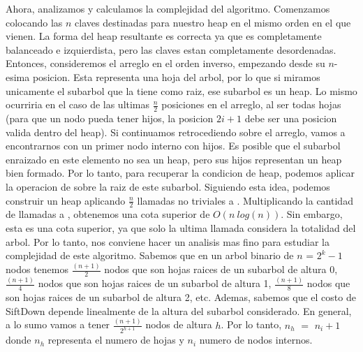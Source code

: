 \documentclass[10pt,a4paper]{article}
\begin{document}
Ahora, analizamos y calculamos la complejidad del algoritmo.
\newline
\newline
Comenzamos colocando las $n$ claves destinadas para nuestro heap en el mismo orden en el que
vienen. La forma del heap resultante es correcta ya que es completamente balanceado e izquierdista, pero las claves estan completamente desordenadas. 
\newline
\newline
Entonces, consideremos el arreglo en el orden inverso, empezando desde su $n$-esima posicion. Esta representa una hoja del arbol, por lo que si miramos unicamente el subarbol que la tiene como raiz, ese subarbol es un heap. Lo mismo ocurriria en el caso de las ultimas $\displaystyle \frac{n}{2}$ posiciones en el arreglo, al ser todas hojas (para que un nodo pueda tener hijos, la posicion $2i + 1$ debe ser una posicion valida dentro del heap). Si continuamos retrocediendo sobre el arreglo, vamos a encontrarnos con un primer nodo interno con hijos. Es posible que el subarbol enraizado en este elemento no sea un heap, pero sus hijos representan un heap bien formado. Por lo tanto, para recuperar la condicion de heap, podemos aplicar la operacion de  sobre la raiz de este subarbol. Siguiendo esta idea, podemos construir un heap aplicando $\displaystyle \frac{n}{2}$ llamadas no triviales a .
\newline
\newline
Multiplicando la cantidad de llamadas a , obtenemos una cota superior de $O(n~log(n))$. Sin embargo, esta es una cota superior, ya que solo la ultima llamada considera la totalidad del arbol. Por lo tanto, nos conviene hacer un analisis mas fino para estudiar la complejidad de este algoritmo.
\newline
\newline
Sabemos que en un arbol binario de $n$ = $2^{k} - 1$ nodos tenemos $\displaystyle \frac{(n+1)}{2}$ nodos que son hojas raices de un subarbol de altura 0, $\displaystyle \frac{(n+1)}{4}$ nodos que son hojas raices de un subarbol de altura 1, $\displaystyle \frac{(n+1)}{8}$ nodos que son hojas raices de un subarbol de altura 2, etc. Ademas, sabemos que el costo de SiftDown depende linealmente de la altura del subarbol considerado. En general, a lo sumo vamos a tener $\displaystyle \frac{(n+1)}{2^{h+1}}$ nodos de altura $h$.
\newline
\newline
Por lo tanto, $n_{h}$ $=$ $n_{i} + 1$ donde $n_{h}$ representa el numero de hojas y $n_{i}$ numero de nodos internos.
\end{document}
